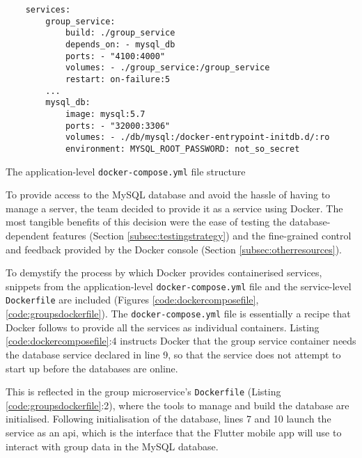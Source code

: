 \documentclass{article}
\begin{document}
    \begin{listing}[ht]
    \begin{verbatim}
    services:
        group_service:
            build: ./group_service
            depends_on: - mysql_db
            ports: - "4100:4000"
            volumes: - ./group_service:/group_service 
            restart: on-failure:5
        ...
        mysql_db:
            image: mysql:5.7
            ports: - "32000:3306"
            volumes: - ./db/mysql:/docker-entrypoint-initdb.d/:ro
            environment: MYSQL_ROOT_PASSWORD: not_so_secret
    \end{verbatim}
    \caption{The application-level \texttt{docker-compose.yml} file structure}
    \label{code:dockercomposefile}
    \end{listing}
    
    To provide access to the MySQL database and avoid the hassle of having to manage a server, the team decided to provide it as a service using Docker. The most tangible benefits of this decision were the ease of testing the database-dependent features (Section \ref{subsec:testingstrategy}) and the fine-grained control and feedback provided by the Docker console (Section \ref{subsec:otherresources}). \par
    
    To demystify the process by which Docker provides containerised services, snippets from the application-level \texttt{docker-compose.yml} file and the service-level \texttt{Dockerfile} are included (Figures \ref{code:dockercomposefile}, \ref{code:groupsdockerfile}). The \texttt{docker-compose.yml} file is essentially a recipe that Docker follows to provide all the services as individual containers. Listing \ref{code:dockercomposefile}:4 instructs Docker that the group service container needs the database service declared in line 9, so that the service does not attempt to start up before the databases are online. \par
    
    This is reflected in the group microservice's \texttt{Dockerfile} (Listing \ref{code:groupsdockerfile}:2), where the tools to manage and build the database are initialised. Following initialisation of the database, lines 7 and 10 launch the service as an \acrshort{api}, which is the interface that the Flutter mobile app will use to interact with group data in the MySQL database. \par
    
\end{document}
